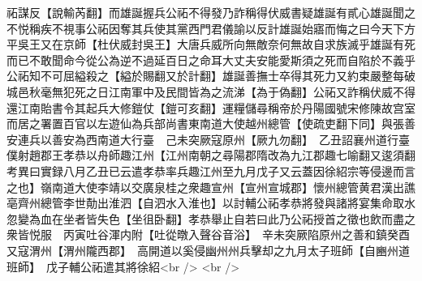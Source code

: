祏謀反【說輸芮翻】而雄誕握兵公祏不得發乃詐稱得伏威書疑雄誕有貳心雄誕聞之不悦稱疾不視事公祏因奪其兵使其黨西門君儀諭以反計雄誕始寤而悔之曰今天下方平吳王又在京師【杜伏威封吳王】大唐兵威所向無敵奈何無故自求族滅乎雄誕有死而已不敢聞命今從公為逆不過延百日之命耳大丈夫安能愛斯須之死而自陷於不義乎公祏知不可屈縊殺之【縊於賜翻又於計翻】雄誕善撫士卒得其死力又約束嚴整每破城邑秋毫無犯死之日江南軍中及民間皆為之流涕【為于偽翻】公祏又詐稱伏威不得還江南貽書令其起兵大修鎧仗【鎧可亥翻】運糧儲尋稱帝於丹陽國號宋修陳故宫室而居之署置百官以左遊仙為兵部尚書東南道大使越州總管【使疏吏翻下同】與張善安連兵以善安為西南道大行臺　己未突厥寇原州【厥九勿翻】　乙丑詔襄州道行臺僕射趙郡王孝恭以舟師趣江州【江州南朝之尋陽郡隋改為九江郡趣七喻翻又逡須翻　考異曰實録八月乙丑已云遣孝恭率兵趣江州至九月戊子又云蓋因徐紹宗等侵邊而言之也】嶺南道大使李靖以交廣泉桂之衆趣宣州【宣州宣城郡】懷州總管黄君漢出譙亳齊州總管李世勣出淮泗【自泗水入淮也】以討輔公祏孝恭將發與諸將宴集命取水忽變為血在坐者皆失色【坐徂卧翻】孝恭舉止自若曰此乃公祏授首之徵也飲而盡之衆皆悦服　丙寅吐谷渾内附【吐從暾入聲谷音浴】　辛未突厥陷原州之善和鎮癸酉又寇渭州【渭州隴西郡】　高開道以奚侵幽州州兵擊却之九月太子班師【自豳州道班師】　戊子輔公祏遣其將徐紹<br />
<br />
